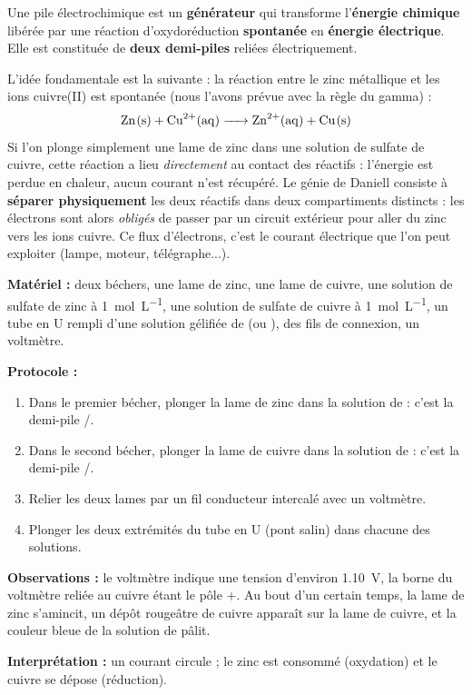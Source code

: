 \documentclass[11pt]{article}
\newcommand{\cle}[1]{{\popxbold\color{popdark}#1}}
\newcounter{popsec}
\newcounter{popsub}
\newcommand{\courssub}[1]{%
  \stepcounter{popsub}%
  \par\vspace{9pt}\noindent{\popxbold\fontsize{11.5}{13}\selectfont\color{popink}{\color{poporange}\thepopsec.\thepopsub}\hspace{6pt}#1}\par\nopagebreak\vspace{4pt}
}
\begin{document}
\begin{definition}
Une \cle{pile électrochimique} est un \textbf{générateur} qui transforme l'\textbf{énergie chimique} libérée par une réaction d'oxydoréduction \textbf{spontanée} en \textbf{énergie électrique}. Elle est constituée de \textbf{deux demi-piles} reliées électriquement.
\end{definition}

L'idée fondamentale est la suivante : la réaction entre le zinc métallique et les ions cuivre(II) est spontanée (nous l'avons prévue avec la règle du gamma) :
\[ \ce{Zn(s) + Cu^2+(aq) -> Zn^2+(aq) + Cu(s)} \]
Si l'on plonge simplement une lame de zinc dans une solution de sulfate de cuivre, cette réaction a lieu \emph{directement} au contact des réactifs : l'énergie est perdue en chaleur, aucun courant n'est récupéré. Le génie de Daniell consiste à \textbf{séparer physiquement} les deux réactifs dans deux compartiments distincts : les électrons sont alors \emph{obligés} de passer par un circuit extérieur pour aller du zinc vers les ions cuivre. Ce flux d'électrons, c'est le courant électrique que l'on peut exploiter (lampe, moteur, télégraphe...).

\courssub{Constitution de la pile Daniell}

\begin{experience}
\textbf{Matériel :} deux béchers, une lame de zinc, une lame de cuivre, une solution de sulfate de zinc  à \SI{1}{mol.L^{-1}}, une solution de sulfate de cuivre  à \SI{1}{mol.L^{-1}}, un tube en U rempli d'une solution gélifiée de  (ou ), des fils de connexion, un voltmètre.

\textbf{Protocole :}
\begin{enumerate}
\item Dans le premier bécher, plonger la lame de zinc dans la solution de  : c'est la demi-pile /.
\item Dans le second bécher, plonger la lame de cuivre dans la solution de  : c'est la demi-pile /.
\item Relier les deux lames par un fil conducteur intercalé avec un voltmètre.
\item Plonger les deux extrémités du tube en U (pont salin) dans chacune des solutions.
\end{enumerate}

\textbf{Observations :} le voltmètre indique une tension d'environ \SI{1,10}{V}, la borne du voltmètre reliée au cuivre étant le pôle $+$. Au bout d'un certain temps, la lame de zinc s'amincit, un dépôt rougeâtre de cuivre apparaît sur la lame de cuivre, et la couleur bleue de la solution de  pâlit.

\textbf{Interprétation :} un courant circule ; le zinc est consommé (oxydation) et le cuivre se dépose (réduction).
\end{experience}
\end{document}
